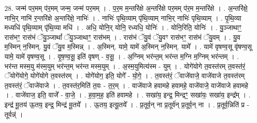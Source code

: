 \documentclass[17pt]{extarticle}
\begin{document}
28. जन्म॑ पर॒मम् प॑र॒मम् जन्म॒ जन्म॑ पर॒मम् । . प॒र॒म म॒न्तरि॑क्षे अ॒न्तरि॑क्षे पर॒मम् प॑र॒म म॒न्तरि॑क्षे । . अ॒न्तरि॑क्षे॒ नाभि॒र् नाभि॑ र॒न्तरि॑क्षे अ॒न्तरि॑क्षे॒ नाभिः॑ । . नाभिः॑ पृथि॒व्याम् पृ॑थि॒व्याम् नाभि॒र् नाभिः॑ पृथि॒व्याम् । . पृ॒थि॒व्या मध्यधि॑ पृथि॒व्याम् पृ॑थि॒व्या मधि॑ । . अधि॒ योनि॒र् योनि॒ रध्यधि॒ योनिः॑ । . योनि॒रिति॒ योनिः॑ । . यु॒ञ्जाथाꣳ॒॒ रास॑भꣳ॒॒ रास॑भं ॅयु॒ञ्जाथां᳚ ॅयु॒ञ्जाथाꣳ॒॒ रास॑भम् । . रास॑भं ॅयु॒वं ॅयु॒वꣳ रास॑भꣳ॒॒ रास॑भं ॅयु॒वम् । . यु॒व म॒स्मिन् न॒स्मिन्. यु॒वं ॅयु॒व म॒स्मिन्न् । . अ॒स्मिन्. यामे॒ यामे॑ अ॒स्मिन् न॒स्मिन्. यामे᳚ । . यामे॑ वृषण्व॒सू वृ॑षण्व॒सू यामे॒ यामे॑ वृषण्व॒सू । . वृ॒ष॒ण्व॒सू॒ इति॑ वृषण् - व॒सू॒ । . अ॒ग्निम् भर॑न्त॒म् भर॑न्त म॒ग्नि म॒ग्निम् भर॑न्तम् । . भर॑न्त मस्म॒यु म॑स्म॒युम् भर॑न्त॒म् भर॑न्त मस्म॒युम् । . अ॒स्म॒युमित्य॑स्म - युम् । . योगे॑योगे त॒वस्त॑रम् त॒वस्त॑रं॒ ॅयोगे॑योगे॒ योगे॑योगे त॒वस्त॑रम् । . योगे॑योग॒ इति॒ योगे᳚ - यो॒गे॒ । . त॒वस्त॑रं॒ ॅवाजे॑वाजे॒ वाजे॑वाजे त॒वस्त॑रम् त॒वस्त॑रं॒ ॅवाजे॑वाजे । . त॒वस्त॑र॒मिति॑ त॒वः - त॒र॒म् । . वाजे॑वाजे हवामहे हवामहे॒ वाजे॑वाजे॒ वाजे॑वाजे हवामहे । . वाजे॑वाज॒ इति॒ वाजे᳚ - वा॒जे॒ । . ह॒वा॒म॒ह॒ इति॑ हवामहे । . सखा॑य॒ इन्द्र॒ मिन्द्रꣳ॒॒ सखा॑यः॒ सखा॑य॒ इन्द्र᳚म् । . इन्द्र॑ मू॒तय॑ ऊ॒तय॒ इन्द्र॒ मिन्द्र॑ मू॒तये᳚ । . ऊ॒तय॒ इत्यू॒तये᳚ । . प्र॒तूर्व॒न् ना प्र॒तूर्व॑न् प्र॒तूर्व॒न् ना । . प्र॒तूर्व॒न्निति॑ प्र - तूर्वन्न्॑ । \newline
\end{document}

